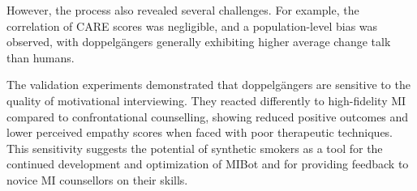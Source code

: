 However, the process also revealed several challenges. For example, the correlation of
CARE scores was negligible, and a population-level bias was observed, with
doppelgängers generally exhibiting higher average change talk than humans.

The validation experiments demonstrated that doppelgängers are sensitive to the quality
of motivational interviewing. They reacted differently to high-fidelity MI compared to
confrontational counselling, showing reduced positive outcomes and lower perceived
empathy scores when faced with poor therapeutic techniques. This sensitivity suggests
the potential of synthetic smokers as a tool for the continued development and
optimization of MIBot and for providing feedback to novice MI counsellors on their
skills.